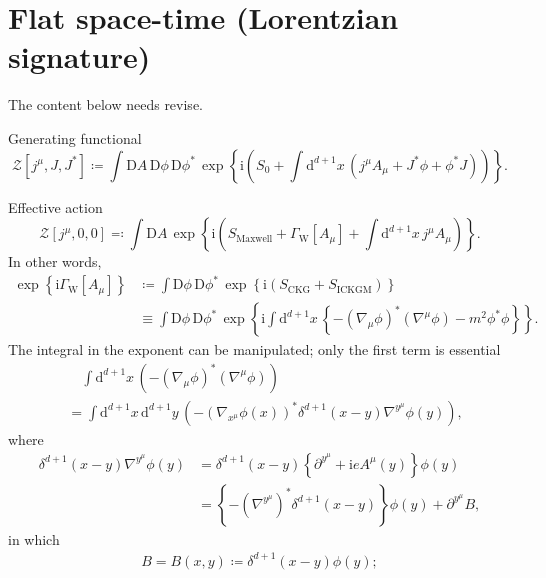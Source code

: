 \documentclass[12pt]{article}
\newcommand\mi{\mathrm{i}} %
\newcommand\dif{\mathrm{d}}
\newcommand\Dif{\mathrm{D}}
\newcommand{\rbr}[1]{{\left(#1\right)}}
\newcommand{\cbr}[1]{{\left\{#1\right\}}}
\newcommand{\rfun}[2]{{#1}\mathopen{}\left(#2\right)\mathclose{}}
\newcommand{\sfun}[2]{{#1}\mathopen{}\left[#2\right]\mathclose{}}
\newcommand{\cfun}[2]{{#1}\mathopen{}\left\{#2\right\}\mathclose{}}
\begin{document}
\section{Flat space-time (Lorentzian signature)}


The content below needs revise.

Generating functional
\begin{equation}
\sfun{\mathcal{Z}}{j^\mu, J, J^*} \coloneqq
\int\Dif A\,\Dif\phi\,\Dif\phi^*\,\cfun{\exp}{\mi\rbr{S_0
+\int\dif^{d+1} x\,\rbr{j^\mu A_\mu + J^* \phi+\phi^* J}}}.
\end{equation}

Effective action
\begin{equation}
\sfun{\mathcal{Z}}{j^\mu, 0, 0} \eqqcolon
\int\Dif A\,\cfun{\exp}{\mi\rbr{S_\text{Maxwell} + 
\sfun{\varGamma_\text{W}}{A_\mu}
+\int\dif^{d+1} x \,j^\mu A_\mu}}.
\end{equation}
In other words,
\begin{align}
\cfun{\exp}{\mi\sfun{\varGamma_\text{W}}{A_\mu}} &\coloneqq 
\int\Dif\phi\,\Dif\phi^*\,
\cfun{\exp}{\mi\rbr{S_\text{CKG}+S_\text{ICKGM}}}
\nonumber \\
&\equiv  \int\Dif\phi\,\Dif\phi^*\,
\cfun{\exp}{\mi\int\dif^{d+1}x\,\cbr{-\rbr{\nabla_\mu\phi}^* 
\rbr{\nabla^\mu\phi} - m^2\phi^*\phi}}.
\label{eq:scalar-qed-to-be-manipulated}
\end{align}
The integral in the exponent can be manipulated; only the first term is 
essential
\begin{align}
&\quad\int\dif^{d+1}x\,\rbr{-\rbr{\nabla_\mu\phi}^* \rbr{\nabla^\mu\phi}} 
\nonumber \\
&= \int\dif^{d+1}x\,\dif^{d+1}y\,\rbr{
-\rbr{\nabla_{x^\mu}\rfun{\phi}{x}}^* \rfun{\delta^{d+1}}{x-y}
\nabla^{y^\mu}\rfun{\phi}{y}},
\label{eq:scalar-qed-matrix-1}
\end{align}
where
\begin{align}
\rfun{\delta^{d+1}}{x-y} \nabla^{y^\mu}\rfun{\phi}{y}
&= \rfun{\delta^{d+1}}{x-y}
\cbr{\partial^{y^\mu}+\mi e \rfun{A^\mu}{y}}\rfun{\phi}{y} \nonumber \\
&= \cbr{-\rbr{\nabla^{y^\mu}}^*\rfun{\delta^{d+1}}{x-y}}\rfun{\phi}{y}
+\partial^{y^\mu}B,
\end{align}
in which
\begin{align}
B = \rfun{B}{x,y} \coloneqq \rfun{\delta^{d+1}}{x-y}\rfun{\phi}{y};
\end{align}
\end{document}
